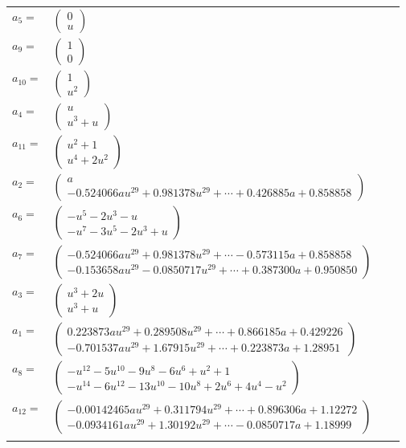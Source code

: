 \documentclass[1p]{elsarticle_modified}
\theoremstyle{definition}
\begin{document}
\begin{tabular}{m{7pt} m{180pt} m{7pt} m{180pt} }
\flushright $a_{5}=$&$\begin{pmatrix}0\\u\end{pmatrix}$ \\
\flushright $a_{9}=$&$\begin{pmatrix}1\\0\end{pmatrix}$ \\
\flushright $a_{10}=$&$\begin{pmatrix}1\\u^2\end{pmatrix}$ \\
\flushright $a_{4}=$&$\begin{pmatrix}u\\u^3+u\end{pmatrix}$ \\
\flushright $a_{11}=$&$\begin{pmatrix}u^2+1\\u^4+2 u^2\end{pmatrix}$ \\
\flushright $a_{2}=$&$\begin{pmatrix}a\\-0.524066 a u^{29}+0.981378 u^{29}+\cdots+0.426885 a+0.858858\end{pmatrix}$ \\
\flushright $a_{6}=$&$\begin{pmatrix}- u^5-2 u^3- u\\- u^7-3 u^5-2 u^3+u\end{pmatrix}$ \\
\flushright $a_{7}=$&$\begin{pmatrix}-0.524066 a u^{29}+0.981378 u^{29}+\cdots-0.573115 a+0.858858\\-0.153658 a u^{29}-0.0850717 u^{29}+\cdots+0.387300 a+0.950850\end{pmatrix}$ \\
\flushright $a_{3}=$&$\begin{pmatrix}u^3+2 u\\u^3+u\end{pmatrix}$ \\
\flushright $a_{1}=$&$\begin{pmatrix}0.223873 a u^{29}+0.289508 u^{29}+\cdots+0.866185 a+0.429226\\-0.701537 a u^{29}+1.67915 u^{29}+\cdots+0.223873 a+1.28951\end{pmatrix}$ \\
\flushright $a_{8}=$&$\begin{pmatrix}- u^{12}-5 u^{10}-9 u^8-6 u^6+u^2+1\\- u^{14}-6 u^{12}-13 u^{10}-10 u^8+2 u^6+4 u^4- u^2\end{pmatrix}$ \\
\flushright $a_{12}=$&$\begin{pmatrix}-0.00142465 a u^{29}+0.311794 u^{29}+\cdots+0.896306 a+1.12272\\-0.0934161 a u^{29}+1.30192 u^{29}+\cdots-0.0850717 a+1.18999\end{pmatrix}$\\&\end{tabular}
\end{document}
